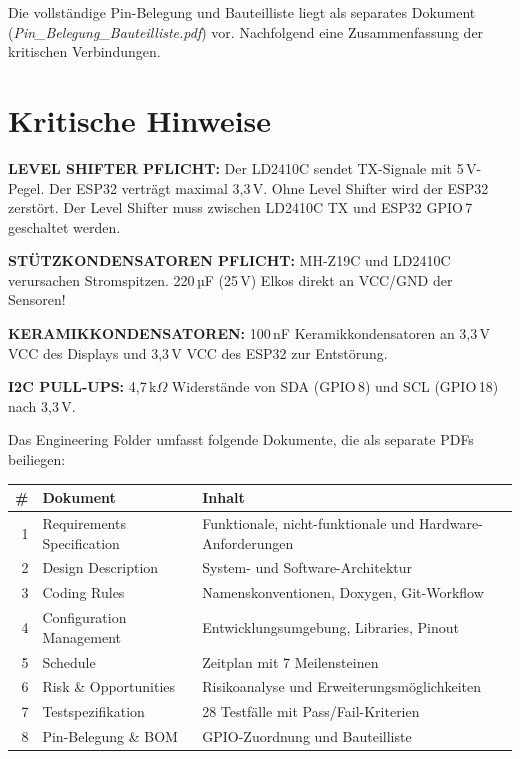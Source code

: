 Die vollständige Pin-Belegung und Bauteilliste liegt als separates Dokument (\textit{Pin\_Belegung\_Bauteilliste.pdf}) vor. Nachfolgend eine Zusammenfassung der kritischen Verbindungen.

\section{Kritische Hinweise}

\textbf{LEVEL SHIFTER PFLICHT:} Der LD2410C sendet TX-Signale mit 5\,V-Pegel. Der ESP32 verträgt maximal 3,3\,V. Ohne Level Shifter wird der ESP32 zerstört. Der Level Shifter muss zwischen LD2410C TX und ESP32 GPIO\,7 geschaltet werden.

\textbf{STÜTZKONDENSATOREN PFLICHT:} MH-Z19C und LD2410C verursachen Stromspitzen. 220\,µF (25\,V) Elkos direkt an VCC/GND der Sensoren!

\textbf{KERAMIKKONDENSATOREN:} 100\,nF Keramikkondensatoren an 3,3\,V VCC des Displays und 3,3\,V VCC des ESP32 zur Entstörung.

\textbf{I2C PULL-UPS:} 4,7\,k$\Omega$ Widerstände von SDA (GPIO\,8) und SCL (GPIO\,18) nach 3,3\,V.

\setcounter{chapter}{4}
\setcounter{section}{0}
\setcounter{table}{0}

Das Engineering Folder umfasst folgende Dokumente, die als separate PDFs beiliegen:

\begin{table}[hbt]
\centering
\renewcommand{\arraystretch}{1.3}
\label{tab:eng_folder}
\begin{tabular}{r p{4cm} p{7cm}}
\toprule
\rowcolor{tableheader}
\textbf{\#} & \textbf{Dokument} & \textbf{Inhalt} \\
\midrule
1 & Requirements Specification & Funktionale, nicht-funktionale und Hardware-Anforderungen \\
2 & Design Description & System- und Software-Architektur \\
3 & Coding Rules & Namenskonventionen, Doxygen, Git-Workflow \\
4 & Configuration Management & Entwicklungsumgebung, Libraries, Pinout \\
5 & Schedule & Zeitplan mit 7 Meilensteinen \\
6 & Risk \& Opportunities & Risikoanalyse und Erweiterungsmöglichkeiten \\
7 & Testspezifikation & 28 Testfälle mit Pass/Fail-Kriterien \\
8 & Pin-Belegung \& BOM & GPIO-Zuordnung und Bauteilliste \\
\bottomrule
\end{tabular}
\end{table}
